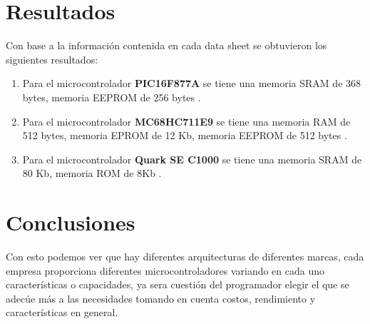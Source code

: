 \documentclass{article}
\begin{document}
\section{Resultados}
Con base a la información contenida en cada data sheet se obtuvieron los siguientes resultados:
\begin{enumerate}
    \item Para el microcontrolador {\bf PIC16F877A} se tiene una memoria SRAM de 368 bytes, memoria EEPROM de 256 bytes \cite{microship}.
    \item Para el microcontrolador {\bf MC68HC711E9} se tiene una memoria RAM de 512 bytes, memoria EPROM de 12 Kb, memoria EEPROM de 512 bytes \cite{motorola}.
    \item Para el microcontrolador {\bf Quark SE C1000} se tiene una memoria SRAM de 80 Kb, memoria ROM de 8Kb \cite{intel}.
\end{enumerate}


\section{Conclusiones}
Con esto podemos ver que hay diferentes arquitecturas de diferentes marcas, cada empresa proporciona diferentes microcontroladores variando en cada uno características o capacidades, ya sera cuestión del programador elegir el que se adecúe más a las necesidades tomando en cuenta costos, rendimiento y características en general.



%

\renewcommand{\refname}{Referencias}

\end{document}

